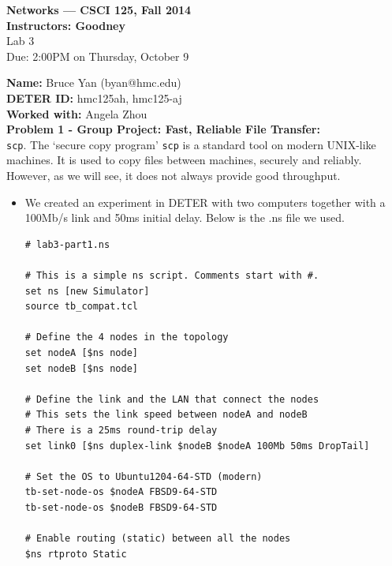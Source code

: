 \documentclass[10pt]{article}
\newcommand{\Problem}[1]{\noindent \textbf{\textbf{Problem #1:  \\ }}}
\newcommand{\Name}[1]{\noindent \textbf{Name:} #1 \\}
\newcommand{\Workedwith}[1]{\noindent \textbf{Worked with:} #1 \\}
\newcommand{\psheader}[2]{
  \begin{center}{\bf Networks --- CSCI 125, Fall 2014 \\
    Instructors: Goodney \\}
    Lab #1 \\
    Due: 2:00PM on #2
    \vspace*{.5cm}
  \end{center}
}
\newcommand{\DeterLabID}[1]{\noindent \textbf{DETER ID:} #1 \\}
\begin{document}
\psheader{3}{Thursday, October 9}


\Name{Bruce Yan (byan@hmc.edu)}
\DeterLabID{hmc125ah, hmc125-aj}
\Workedwith{Angela Zhou}

\Problem{1 - Group Project: Fast, Reliable File Transfer}
\texttt{scp}. The `secure copy program' \texttt{scp} is a standard tool on modern UNIX-like machines. It is used to copy files between machines, securely and reliably. However, as we will see, it does not always provide good throughput.
\begin{itemize}
\itemsep0em
\item We created an experiment in DETER with two computers together with a 100Mb/s link and 50ms initial delay.  Below is the .ns file we used.
\begin{lstlisting}
# lab3-part1.ns

# This is a simple ns script. Comments start with #.
set ns [new Simulator]
source tb_compat.tcl

# Define the 4 nodes in the topology
set nodeA [$ns node]
set nodeB [$ns node]

# Define the link and the LAN that connect the nodes
# This sets the link speed between nodeA and nodeB
# There is a 25ms round-trip delay
set link0 [$ns duplex-link $nodeB $nodeA 100Mb 50ms DropTail]

# Set the OS to Ubuntu1204-64-STD (modern)
tb-set-node-os $nodeA FBSD9-64-STD
tb-set-node-os $nodeB FBSD9-64-STD

# Enable routing (static) between all the nodes
$ns rtproto Static


\end{lstlisting}
\end{itemize}
\end{document}
